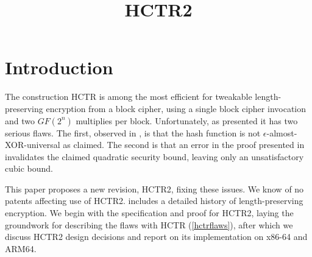 \documentclass[letterpaper,11pt]{article}
\title{HCTR2}
\begin{document}
\maketitle

\begin{abstract}
\end{abstract}

\section{Introduction}
The construction HCTR\cite{hctr} is among the most efficient for 
tweakable length-preserving encryption from a block cipher, using
a single block cipher invocation and two \(GF(2^n)\) multiplies
per block. Unfortunately, as presented it has two serious flaws.
The first, observed in \cite{kumarhctr}, is that the hash function
is not \(\epsilon\)-almost-XOR-universal\cite{eadu} as claimed.
The second is that an error in the proof presented in \cite{hctrquad}
invalidates the claimed quadratic security bound, leaving
only an unsatisfactory cubic bound. 

This paper proposes a new revision, HCTR2, fixing these issues.
We know of no patents affecting use of HCTR2.
\cite{adiantum} includes a detailed history of length-preserving encryption.
We begin with the specification and proof for HCTR2, laying
the groundwork for describing the flaws with HCTR (\autoref{hctrflaws}),
after which we discuss HCTR2 design decisions
and report on its implementation on x86-64 and ARM64.
\end{document}
